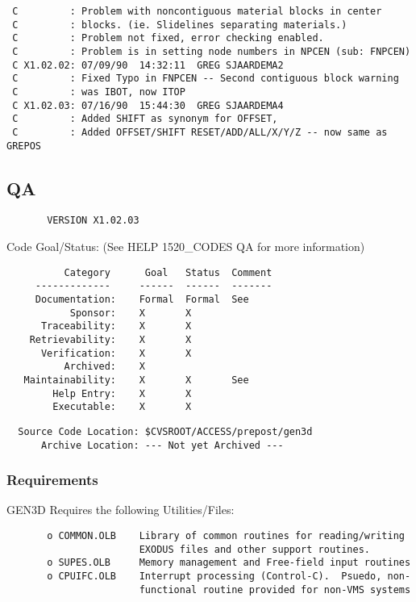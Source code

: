 \begin{verbatim}
 C         : Problem with noncontiguous material blocks in center             
 C         : blocks. (ie. Slidelines separating materials.)                    
 C         : Problem not fixed, error checking enabled.                        
 C         : Problem is in setting node numbers in NPCEN (sub: FNPCEN)         
 C X1.02.02: 07/09/90  14:32:11  GREG SJAARDEMA2                                
 C         : Fixed Typo in FNPCEN -- Second contiguous block warning
 C         : was IBOT, now ITOP                                                 
 C X1.02.03: 07/16/90  15:44:30  GREG SJAARDEMA4
 C         : Added SHIFT as synonym for OFFSET,
 C         : Added OFFSET/SHIFT RESET/ADD/ALL/X/Y/Z -- now same as GREPOS
\end{verbatim}

\subsection{QA}
\begin{verbatim}
       VERSION X1.02.03
\end{verbatim}

Code Goal/Status: (See HELP 1520\_CODES QA for more information)

\begin{verbatim}
          Category      Goal   Status  Comment
     -------------     ------  ------  -------
     Documentation:    Formal  Formal  See 
           Sponsor:    X       X       
      Traceability:    X       X       
    Retrievability:    X       X       
      Verification:    X       X       
          Archived:    X               
   Maintainability:    X       X       See     
        Help Entry:    X       X       
        Executable:    X       X       
\end{verbatim}

\begin{verbatim}
  Source Code Location: $CVSROOT/ACCESS/prepost/gen3d
      Archive Location: --- Not yet Archived ---
\end{verbatim}
\subsubsection{Requirements}
GEN3D Requires the following Utilities/Files:

\begin{verbatim}
       o COMMON.OLB    Library of common routines for reading/writing
                       EXODUS files and other support routines.
       o SUPES.OLB     Memory management and Free-field input routines
       o CPUIFC.OLB    Interrupt processing (Control-C).  Psuedo, non-
                       functional routine provided for non-VMS systems
\end{verbatim}

